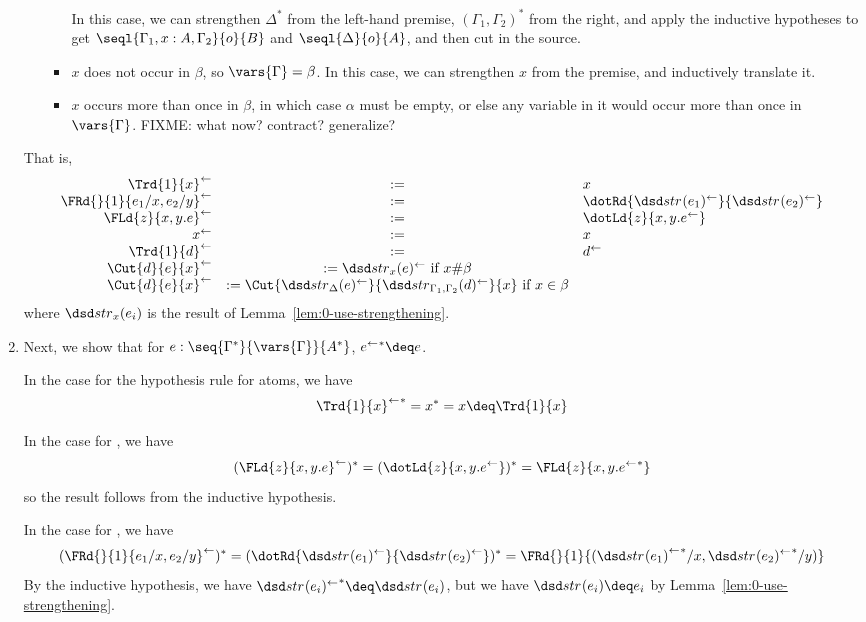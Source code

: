 \begin{enumerate}
\begin{itemize}
\begin{itemize}
  In this case, we can strengthen $\Delta^*$ from the left-hand premise,
  $(\Gamma_1,\Gamma_2)^*$ from the right, and apply the inductive
  hypotheses to get $\seql{\Gamma_1,x:A,\Gamma_2}{o}{B}$ and
  $\seql{\Delta}{o}{A}$, and then cut in the source.

\item $x$ does not occur in $\beta$, so $\vars{\Gamma} = \beta$.  In
  this case, we can strengthen $x$ from the premise, and inductively
  translate it.

\item $x$ occurs more than once in $\beta$, in which case $\alpha$ must
  be empty, or else any variable in it would occur more than once in
  $\vars{\Gamma}$.  FIXME: what now? contract? generalize?

\end{itemize}

\end{itemize}

That is,
\[
\begin{array}{rcl}
\backtrf{\Trd{1}{x}} & := & x\\
\backtrf{\FRd{}{1}{e_1/x,e_2/y}} & := & \dotRd{\backtrf{\str{}{e_1}}}{\backtrf{\str{}{e_2}}}\\
\backtrf{\FLd{z}{x,y.e}} & := & \dotLd{z}{x,y.\backtrf{e}}\\
\backtrf{x} & := & x\\
\backtrf{\Trd{1}{d}} & := & \backtrf{d} \\
\backtrf{\Cut{d}{e}{x}} & := \backtrf{\str{x}{e}} \text{ if } x \# \beta \\
\backtrf{\Cut{d}{e}{x}} & := \Cut{\backtrf{\str{\Delta}{e}}}{\backtrf{\str{\Gamma_1,\Gamma_2}{d}}}{x} \text{ if } x \in \beta\\
\end{array}
\]
where $\str{x}{e_i}$ is the result of Lemma~\ref{lem:0-use-strengthening}.  

\item Next, we show that for $e : \seq{\Gamma^*}{\vars{\Gamma}}{A^*}$,
  ${\backtrf{e}}^* \deq e$.

In the case for the hypothesis rule for atoms, we have
\[
{\backtrf{\Trd{1}{x}}}^* = x^* = x \deq \Trd{1}{x}
\]

In the case for \FL, we have 
\[
(\backtrf{\FLd{z}{x,y.e}})^* = (\dotLd{z}{x,y.\backtrf{e}})^* =
{\FLd{z}{x,y.{\backtrf{e}}^*}}
\]
so the result follows from the inductive hypothesis.  

In the case for \FR, we have
\[
(\backtrf{\FRd{}{1}{e_1/x,e_2/y}})^* = (\dotRd{\backtrf{\str{}{e_1}}}{\backtrf{\str{}{e_2}}})^* =
{\FRd{}{1}{({\backtrf{{\str{}{e_1}}}}^*/x,{\backtrf{\str{}{e_2}}}^*/y)}}
\]
By the inductive hypothesis, we have 
${\backtrf{\str{}{e_i}}}^* \deq \str{}{e_i}$, but we have $\str{}{e_i} \deq e_i$ by
Lemma~\ref{lem:0-use-strengthening}.  


\end{enumerate}
